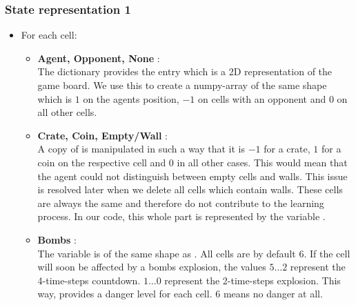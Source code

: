 	\subsubsection{State representation 1}
	\begin{itemize}
		\item For each cell:
		\begin{itemize}
			\item \textbf{Agent, Opponent, None }:\\
			The dictionary provides the entry  which is a 2D representation of the game board. We use this to create a numpy-array  of the same shape which is $1$ on the agents position, $-1$ on cells with an opponent and $0$ on all other cells.
			\item \textbf{Crate, Coin, Empty/Wall }: \\
			A copy of  is manipulated in such a way that it is $-1$ for a crate, $1$ for a coin on the respective cell and $0$ in all other cases. This would mean that the agent could not distinguish between empty cells and walls. This issue is resolved later when we delete all cells which contain walls. These cells are always the same and therefore do not contribute to the learning process. In our code, this whole part is represented by the variable .
			\item \textbf{Bombs} :\\
			The variable  is of the same shape as . All cells are by default $6$. If the cell will soon be affected by a bombs explosion, the values $5\dots2$ represent the 4-time-steps countdown. $1\dots0$ represent the 2-time-steps explosion. This way,  provides a danger level for each cell. $6$ means no danger at all.
			

\end{itemize}
\end{itemize}
